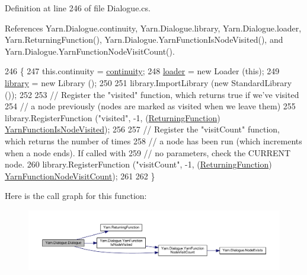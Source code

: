 Definition at line 246 of file Dialogue.\-cs.



References Yarn.\-Dialogue.\-continuity, Yarn.\-Dialogue.\-library, Yarn.\-Dialogue.\-loader, Yarn.\-Returning\-Function(), Yarn.\-Dialogue.\-Yarn\-Function\-Is\-Node\-Visited(), and Yarn.\-Dialogue.\-Yarn\-Function\-Node\-Visit\-Count().


\begin{DoxyCode}
246                                                          \{
247             this.continuity = \hyperlink{a00086_ae94eaa4b03b432422f5d205fabe37ff5}{continuity};
248             \hyperlink{a00086_a98bbe0ac2ccadeeeb7e05e3e6e19f2e0}{loader} = \textcolor{keyword}{new} Loader (\textcolor{keyword}{this});
249             \hyperlink{a00086_ae660d4cfb6e296358d2f61d8ee74c66a}{library} = \textcolor{keyword}{new} Library ();
250 
251             library.ImportLibrary (\textcolor{keyword}{new} StandardLibrary ());
252 
253             \textcolor{comment}{// Register the "visited" function, which returns true if we've visited}
254             \textcolor{comment}{// a node previously (nodes are marked as visited when we leave them)}
255             library.RegisterFunction (\textcolor{stringliteral}{"visited"}, -1, (\hyperlink{a00045_a5177bf74fbfe7303fac9d8236c2e514b}{ReturningFunction})
      \hyperlink{a00086_a1ab129bd84381928531d503304ca08d6}{YarnFunctionIsNodeVisited});
256 
257             \textcolor{comment}{// Register the "visitCount" function, which returns the number of times}
258             \textcolor{comment}{// a node has been run (which increments when a node ends). If called with}
259             \textcolor{comment}{// no parameters, check the CURRENT node.}
260             library.RegisterFunction (\textcolor{stringliteral}{"visitCount"}, -1, (\hyperlink{a00045_a5177bf74fbfe7303fac9d8236c2e514b}{ReturningFunction})
      \hyperlink{a00086_a10c9f22d3f55e74f091cd6069c431094}{YarnFunctionNodeVisitCount});
261 
262         \}
\end{DoxyCode}


Here is the call graph for this function\-:
\nopagebreak
\begin{figure}[H]
\begin{center}
\leavevmode
\includegraphics[width=350pt]{a00086_a349debf4c4b8d48e3d80ff31ad380b0e_cgraph}
\end{center}
\end{figure}




